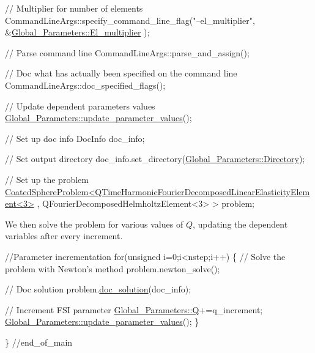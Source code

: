 \begin{DoxyCodeInclude}
 \textcolor{comment}{// Multiplier for number of elements}
 CommandLineArgs::specify\_command\_line\_flag(\textcolor{stringliteral}{"--el\_multiplier"},
                                            &\hyperlink{namespaceGlobal__Parameters_a35d5d2ecfff0cec6150a5dc79e5c1ad1}{Global\_Parameters::El\_multiplier}
      );
 
 \textcolor{comment}{// Parse command line}
 CommandLineArgs::parse\_and\_assign(); 
 
 \textcolor{comment}{// Doc what has actually been specified on the command line}
 CommandLineArgs::doc\_specified\_flags();

 \textcolor{comment}{// Update dependent parameters values}
 \hyperlink{namespaceGlobal__Parameters_ae0f9a80fb7510dbfbbef22582da231b7}{Global\_Parameters::update\_parameter\_values}();

 \textcolor{comment}{// Set up doc info}
 DocInfo doc\_info;
 
 \textcolor{comment}{// Set output directory}
 doc\_info.set\_directory(\hyperlink{namespaceGlobal__Parameters_a301ab922df72030c660b21328d6caf76}{Global\_Parameters::Directory});
 
 \textcolor{comment}{// Set up the problem}
 \hyperlink{classCoatedSphereProblem}{CoatedSphereProblem<QTimeHarmonicFourierDecomposedLinearElasticityElement<3>}
      ,
                     QFourierDecomposedHelmholtzElement<3> > problem;

\end{DoxyCodeInclude}


We then solve the problem for various values of $ Q $, updating the dependent variables after every increment.


\begin{DoxyCodeInclude}

 \textcolor{comment}{//Parameter incrementation}
 \textcolor{keywordflow}{for}(\textcolor{keywordtype}{unsigned} i=0;i<nstep;i++)
  \{
   \textcolor{comment}{// Solve the problem with Newton's method}
   problem.newton\_solve();

   \textcolor{comment}{// Doc solution}
   problem.\hyperlink{classCoatedSphereProblem_aaeade2a110160c002b2b45954a5a0edc}{doc\_solution}(doc\_info);

   \textcolor{comment}{// Increment FSI parameter}
   \hyperlink{namespaceGlobal__Parameters_a7814fddf663e56168174a42d2cd6b4c1}{Global\_Parameters::Q}+=q\_increment;
   \hyperlink{namespaceGlobal__Parameters_ae0f9a80fb7510dbfbbef22582da231b7}{Global\_Parameters::update\_parameter\_values}();
  \}

\} \textcolor{comment}{//end\_of\_main}

\end{DoxyCodeInclude}





